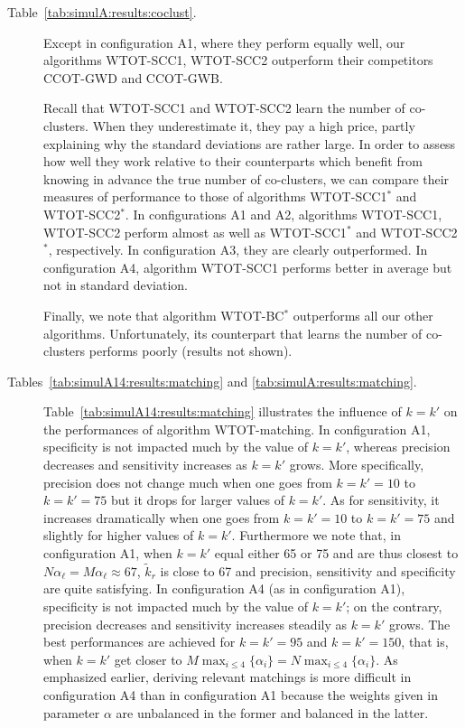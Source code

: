 \begin{description}
\item[Table~\ref{tab:simulA:results:coclust}.]   Except  in configuration  A1,
  where  they  perform  equally  well,  our  algorithms  WTOT-SCC1,  WTOT-SCC2
  outperform their competitors CCOT-GWD and CCOT-GWB.

  Recall that WTOT-SCC1  and WTOT-SCC2 learn the number  of co-clusters.  When
  they underestimate  it, they  pay a  high price,  partly explaining  why the
  standard deviations are rather large. In  order to assess how well they work
  relative to  their counterparts  which benefit from  knowing in  advance the
  true number of co-clusters, we can  compare their measures of performance to
  those of  algorithms WTOT-SCC1$^*$ and WTOT-SCC2$^*$.   In configurations A1
  and  A2,  algorithms   WTOT-SCC1,  WTOT-SCC2  perform  almost   as  well  as
  WTOT-SCC1$^*$ and  WTOT-SCC2$^*$, respectively.   In configuration  A3, they
  are clearly outperformed.  In configuration A4, algorithm WTOT-SCC1 performs
  better in average but not in standard deviation.

  Finally,  we  note  that  algorithm   WTOT-BC$^*$  outperforms  all  our  other
  algorithms.   Unfortunately,  its  counterpart  that learns  the  number  of
  co-clusters performs poorly (results not shown).
\item[Tables~\ref{tab:simulA14:results:matching}                           and
  \ref{tab:simulA:results:matching}.]
  Table~\ref{tab:simulA14:results:matching}   illustrates  the   influence  of
  $k=k'$ on the performances of  algorithm WTOT-matching. In configuration A1,
  specificity is not  impacted much by the value of  $k=k'$, whereas precision
  decreases  and sensitivity  increases as  $k=k'$ grows.   More specifically,
  precision does not change much when one goes from $k=k'=10$ to $k=k'=75$ but
  it drops  for larger  values of  $k=k'$.  As  for sensitivity,  it increases
  dramatically  when one  goes from  $k=k'=10$ to  $k=k'=75$ and  slightly for
  higher values  of $k=k'$.   Furthermore we note  that, in  configuration A1,
  when   $k=k'$  equal   either   65   or  75   and   are   thus  closest   to
  $N\alpha_{\ell} = M\alpha_{\ell} \approx 67$, $\tilde{k}_{r}$ is close to 67
  and  precision,  sensitivity  and  specificity  are  quite  satisfying.   In
  configuration A4 (as in configuration  A1), specificity is not impacted much
  by the value of $k=k'$; on the contrary, precision decreases and sensitivity
  increases steadily as $k=k'$ grows.   The best performances are achieved for
  $k=k'=95$   and   $k=k'=150$,  that   is,   when   $k=k'$  get   closer   to
  $M\max_{i\leq  4}\{\alpha_{i}\}  =   N  \max_{i\leq  4}\{\alpha_{i}\}$.   As
  emphasized  earlier,  deriving  relevant  matchings  is  more  difficult  in
  configuration  A4 than  in configuration  A1  because the  weights given  in
  parameter $\alpha$ are unbalanced in the former and balanced in the latter.


\end{description}
